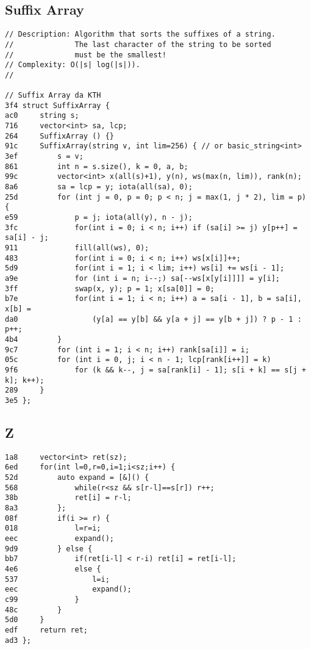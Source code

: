 \documentclass[11pt, a4paper, twoside]{article}
\begin{document}
\subsection{Suffix Array}
\begin{lstlisting}
// Description: Algorithm that sorts the suffixes of a string.
//              The last character of the string to be sorted 
//              must be the smallest!
// Complexity: O(|s| log(|s|)).
//

// Suffix Array da KTH
3f4 struct SuffixArray {
ac0     string s;
716     vector<int> sa, lcp;
264     SuffixArray () {}
91c     SuffixArray(string v, int lim=256) { // or basic_string<int>
3ef         s = v;
861         int n = s.size(), k = 0, a, b;
99c         vector<int> x(all(s)+1), y(n), ws(max(n, lim)), rank(n);
8a6         sa = lcp = y; iota(all(sa), 0);
25d         for (int j = 0, p = 0; p < n; j = max(1, j * 2), lim = p) {
e59             p = j; iota(all(y), n - j);
3fc             for(int i = 0; i < n; i++) if (sa[i] >= j) y[p++] = sa[i] - j;
911             fill(all(ws), 0);
483             for(int i = 0; i < n; i++) ws[x[i]]++;
5d9             for(int i = 1; i < lim; i++) ws[i] += ws[i - 1];
a9e             for (int i = n; i--;) sa[--ws[x[y[i]]]] = y[i];
3ff             swap(x, y); p = 1; x[sa[0]] = 0;
b7e             for(int i = 1; i < n; i++) a = sa[i - 1], b = sa[i], x[b] =
da0                 (y[a] == y[b] && y[a + j] == y[b + j]) ? p - 1 : p++;
4b4         }
9c7         for (int i = 1; i < n; i++) rank[sa[i]] = i;
05c         for (int i = 0, j; i < n - 1; lcp[rank[i++]] = k)
9f6             for (k && k--, j = sa[rank[i] - 1]; s[i + k] == s[j + k]; k++);
289     }
3e5 };
\end{lstlisting}

\subsection{Z}
\begin{lstlisting}
1a8 	vector<int> ret(sz);
6ed 	for(int l=0,r=0,i=1;i<sz;i++) {
52d 		auto expand = [&]() {
568 			while(r<sz && s[r-l]==s[r]) r++;
38b 			ret[i] = r-l;
8a3 		};
08f 		if(i >= r) {
018 			l=r=i;
eec 			expand();
9d9 		} else {
bb7 			if(ret[i-l] < r-i) ret[i] = ret[i-l];
4e6 			else {
537 				l=i;
eec 				expand();
c99 			}
48c 		}
5d0 	}
edf 	return ret;
ad3 };
\end{lstlisting}



%
%
\end{document}
